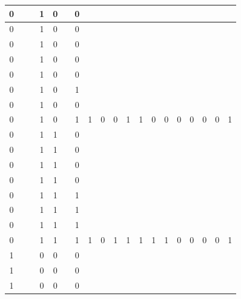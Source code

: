 \begin{table}[!tb]
\begin{tabular}{|c|c|c|c|c|c|c|c|c|c|c|c|c|c|c|c|c|c|c|}
        \rowcolor{red!40} 0 &  &  & 1 & 0 &  & 0 &  &  &  &  &  &  &  &  &  &  &  &  \\ \hline
        \rowcolor{red!40} 0 &  &  & 1 & 0 &  & 0 &  &  &  &  &  &  &  &  &  &  &  &  \\ \hline
        \rowcolor{red!40} 0 &  &  & 1 & 0 &  & 0 &  &  &  &  &  &  &  &  &  &  &  &  \\ \hline
        \rowcolor{red!40} 0 &  &  & 1 & 0 &  & 0 &  &  &  &  &  &  &  &  &  &  &  &  \\ \hline
        \rowcolor{red!40} 0 &  &  & 1 & 0 &  & 0 &  &  &  &  &  &  &  &  &  &  &  &  \\ \hline
        \rowcolor{red!40} 0 &  &  & 1 & 0 &  & 1 &  &  &  &  &  &  &  &  &  &  &  &  \\ \hline
        \rowcolor{red!40} 0 &  &  & 1 & 0 &  & 0 &  &  &  &  &  &  &  &  &  &  &  &  \\ \hline
        \rowcolor{red!40} 0 &  &  & 1 & 0 &  & 1 & 1 & 0 & 0 & 1 & 1 & 0 & 0 & 0 & 0 & 0 & 0 & 1 \\ \hline
        \rowcolor{green!40} 0 &  &  & 1 & 1 &  & 0 &  &  &  &  &  &  &  &  &  &  &  &  \\ \hline
        \rowcolor{green!40} 0 &  &  & 1 & 1 &  & 0 &  &  &  &  &  &  &  &  &  &  &  &  \\ \hline
        \rowcolor{green!40} 0 &  &  & 1 & 1 &  & 0 &  &  &  &  &  &  &  &  &  &  &  &  \\ \hline
        \rowcolor{green!40} 0 &  &  & 1 & 1 &  & 0 &  &  &  &  &  &  &  &  &  &  &  &  \\ \hline
        \rowcolor{green!40} 0 &  &  & 1 & 1 &  & 1 &  &  &  &  &  &  &  &  &  &  &  &  \\ \hline
        \rowcolor{green!40} 0 &  &  & 1 & 1 &  & 1 &  &  &  &  &  &  &  &  &  &  &  &  \\ \hline
        \rowcolor{green!40} 0 &  &  & 1 & 1 &  & 1 &  &  &  &  &  &  &  &  &  &  &  &  \\ \hline
        \rowcolor{green!40} 0 &  &  & 1 & 1 &  & 1 & 1 & 0 & 1 & 1 & 1 & 1 & 1 & 0 & 0 & 0 & 0 & 1 \\ \hline
        \rowcolor{yellow!40} 1 &  &  & 0 & 0 &  & 0 &  &  &  &  &  &  &  &  &  &  &  &  \\ \hline
        \rowcolor{yellow!40} 1 &  &  & 0 & 0 &  & 0 &  &  &  &  &  &  &  &  &  &  &  &  \\ \hline
        \rowcolor{yellow!40} 1 &  &  & 0 & 0 &  & 0 &  &  &  &  &  &  &  &  &  &  &  &  \\ \hline

\end{tabular}
\end{table}
